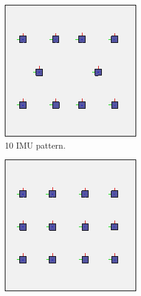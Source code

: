 \begin{figure}[h!]
 \begin{subfigure}[b]{0.2\linewidth}
    \includegraphics[width=\linewidth]{figures/IMU10.png}
    \caption{10 IMU pattern.}
  \end{subfigure}
  \begin{subfigure}[b]{0.2\linewidth}
    \includegraphics[width=\linewidth]{figures/IMU12.png}

\end{subfigure}
\end{figure}
